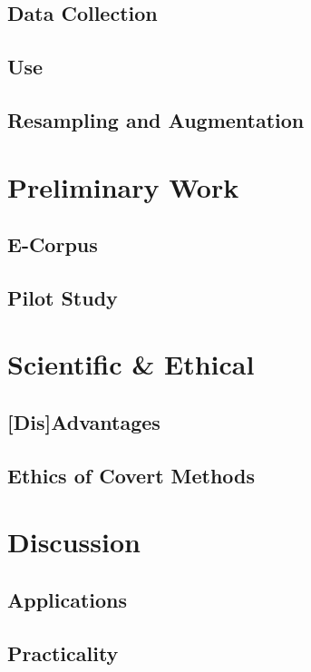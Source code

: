 \documentclass[xcolor=x11names,compress]{beamer}
\begin{document}
\subsection{Data Collection}
\subsection{Use}
\subsection{Resampling and Augmentation} 


\section{Preliminary Work}
\subsection{E-Corpus}
\subsection{Pilot Study}


\section{Scientific \& Ethical}
\subsection{[Dis]Advantages}
\subsection{Ethics of Covert Methods}



\section{Discussion}
\subsection{Applications}
\subsection{Practicality}

% 
% 
%
%
%
\end{document}
